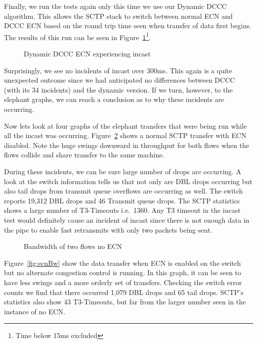 \documentclass[12pt]{article}
\begin{document}
\newpage

Finally, we run the tests again only this time we use our Dynamic DCCC algorithm. This allows the
SCTP stack to switch between normal ECN and DCCC ECN based on the round trip time
seen when transfer of data first begins. The results of this run can be seen in Figure~\ref{fig:dynIncast}\footnote{Time below 15ms excluded}.


\begin{figure}[h]
\centering
{}
\caption{Dynamic DCCC ECN experiencing incast}
\label{fig:dynIncast}
\end{figure}

Surprisingly, we see no incidents of incast over 300ms. This again is a quite unexpected
outcome since we had anticipated no differences between DCCC (with its 34 incidents) and
the dynamic version. If we turn, however, to the elephant graphs, we can reach a conclusion
as to why these incidents are occurring.

\newpage

Now lets look at four graphs of the elephant transfers that were being run while all
the incast was occurring. Figure~\ref{fig:noEcnBw} shows a normal SCTP transfer with
ECN disabled. Note the huge swings downward in throughput for both
flows when the flows collide and share transfer to the same machine. 

During these incidents, we can be sure large number of drops are occurring. A look at the switch
information tells us that not only are DBL drops occurring but also tail
drops from transmit queue overflows are occurring as well.  The switch reports 19,312 DBL drops
and 46 Transmit queue drops. The SCTP statistics shows
a large number of T3-Timeouts i.e.~1360. Any T3 timeout in the incast test would definitely
cause an incident of incast since there is not enough data in the pipe to enable fast retransmits with
only two packets being sent.

\begin{figure}[h]
\centering
{}
\caption{Bandwidth of two flows no ECN}
\label{fig:noEcnBw}
\end{figure}


\newpage

Figure~\ref{fig:ecnBw} show the data transfer when ECN is enabled on
the switch but no alternate congestion control is running. In this graph,
it can be seen to have  less swings and a more orderly set of transfers. Checking
the switch error counts we find that there occurred 1,079 DBL drops and 65 tail
drops. SCTP's statistics also show 43 T3-Timeouts, but far from the larger
number seen in the instance of no ECN.
\end{document}
